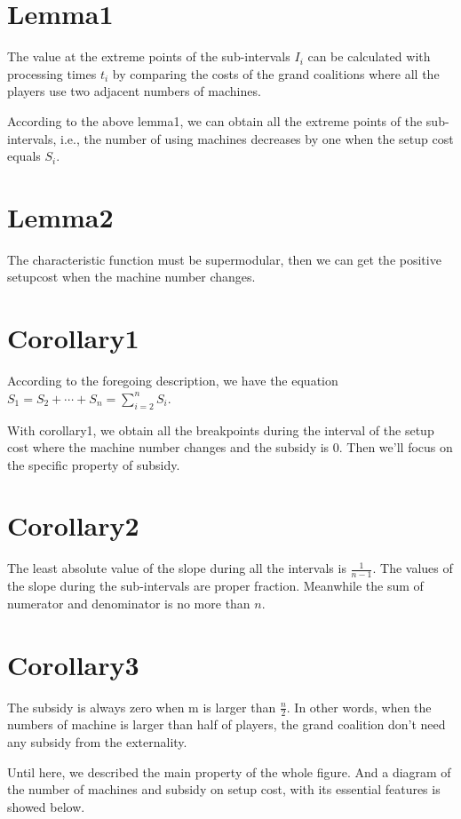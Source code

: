 \documentclass[UTF8]{article}
\begin{document}
\section{Lemma1}
The value at the extreme points of the sub-intervals $I_i$ can be calculated with processing times $t_i$ by comparing the costs of the grand coalitions where all the players use two adjacent numbers of machines.

According to the above lemma1, we can obtain all the extreme points of the sub-intervals, i.e., the number of using machines decreases by one when the setup cost equals $S_i$.

\section{Lemma2}
The characteristic function must be supermodular, then we can get the positive setupcost when the machine number changes.



\section{Corollary1}
According to the foregoing description, we have the equation $S_{1}=S_{2}+\cdots+S_{n}=\sum_{i=2}^n S_i$.

With corollary1, we obtain all the breakpoints during the interval of the setup cost where the machine number changes and the subsidy is $0$. Then we'll focus on the specific property of subsidy.

\section{Corollary2}
The least absolute value of the slope during all the intervals is $\frac{1}{n-1}$.
The values of the slope during the sub-intervals are proper fraction. Meanwhile the sum of numerator and denominator is no more than $n$.

\section{Corollary3}
The subsidy is always zero when m is larger than $\frac{n}{2}$. In other words, when the numbers of machine is larger than half of players, the grand coalition don't need any subsidy from the externality.

Until here, we described the main property of the whole figure.
And a diagram of the number of machines and subsidy on setup cost, with its essential features is showed below.
\end{document}
